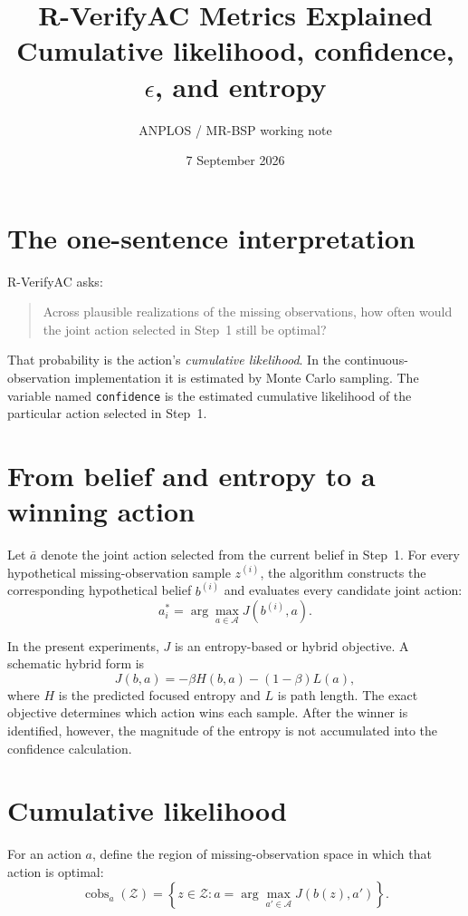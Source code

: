 \documentclass[11pt,a4paper]{article}
\title{R-VerifyAC Metrics Explained\\
\large Cumulative likelihood, confidence, $\epsilon$, and entropy}
\author{ANPLOS / MR-BSP working note}
\date{7 September 2026}
\begin{document}
\maketitle

\section{The one-sentence interpretation}

R-VerifyAC asks:
\begin{quote}
Across plausible realizations of the missing observations, how often would the
joint action selected in Step~1 still be optimal?
\end{quote}

That probability is the action's \emph{cumulative likelihood}.  In the
continuous-observation implementation it is estimated by Monte Carlo sampling.
The variable named \texttt{confidence} is the estimated cumulative likelihood
of the particular action selected in Step~1.

\section{From belief and entropy to a winning action}

Let $\bar a$ denote the joint action selected from the current belief in
Step~1.  For every hypothetical missing-observation sample $z^{(i)}$, the
algorithm constructs the corresponding hypothetical belief $b^{(i)}$ and
evaluates every candidate joint action:
\[
    a_i^* = \arg\max_{a\in\mathcal A} J\!\left(b^{(i)},a\right).
\]

In the present experiments, $J$ is an entropy-based or hybrid objective.  A
schematic hybrid form is
\[
    J(b,a) = -\beta H(b,a) - (1-\beta)L(a),
\]
where $H$ is the predicted focused entropy and $L$ is path length.  The exact
objective determines which action wins each sample.  After the winner is
identified, however, the magnitude of the entropy is not accumulated into the
confidence calculation.

\section{Cumulative likelihood}

For an action $a$, define the region of missing-observation space in which that
action is optimal:
\[
    \operatorname{cobs}_a(\mathcal Z)
    = \left\{z\in\mathcal Z:
      a=\arg\max_{a'\in\mathcal A}J(b(z),a')\right\}.
\]
\end{document}

